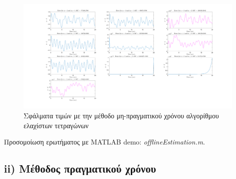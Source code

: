 \documentclass{article}
\begin{document}
\begin{figure}[!htb]
    \centering
    \includegraphics[width=1.1\textwidth]{offlineEstimation.png}
    \caption{\label{fig:offEst}Σφάλματα τιμών με την μέθοδο μη-πραγματικού χρόνου αλγορίθμου ελαχίστων τετραγώνων}
    \end{figure}

Προσομοίωση ερωτήματος με MATLAB demo: \textit{offlineEstimation.m}.

\subsection{ii) Μέθοδος πραγματικού χρόνου}
\end{document}
